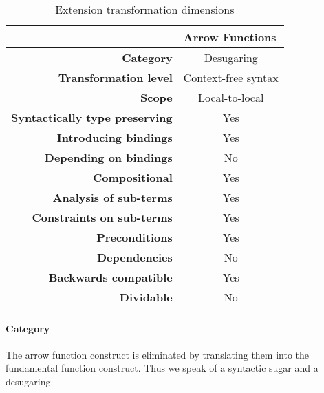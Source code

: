 \documentclass[10pt,a4paper]{article}
\begin{document}
\begin{table}[h]
\centering
\caption{Extension transformation dimensions}
\label{arrow-function-table}
\begin{tabular}{@{}rc@{}}
\toprule
                                       & \multicolumn{1}{l}{\textbf{Arrow Functions}} \\ \midrule
\textbf{Category}                      & Desugaring
\\
\textbf{Transformation level}          & Context-free syntax                          \\
\textbf{Scope}                         & Local-to-local                               \\
\textbf{Syntactically type preserving} & Yes                                          \\
\textbf{Introducing bindings}          & Yes                                          \\%
\textbf{Depending on bindings}         & No                                           \\
\textbf{Compositional}                 & Yes                                          \\
\textbf{Analysis of sub-terms}          & Yes                                          \\
\textbf{Constraints on sub-terms}       & Yes                                           \\
\textbf{Preconditions}                 & Yes                                          \\
\textbf{Dependencies}                  & No                                           \\
\textbf{Backwards compatible}          & Yes                                          \\
\textbf{Dividable}                     & No                                           \\ \bottomrule
\end{tabular}
\end{table}

\paragraph{Category}
The arrow function construct is eliminated by translating them into the fundamental function construct. Thus we speak of a syntactic sugar and a desugaring.
\end{document}
